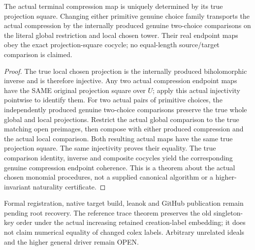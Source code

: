 \begin{theorem}
\label{hir:nc-ordered-choice-open-unique-choice-cocycle}
\leanok
{}
The actual terminal compression map is uniquely determined by its true projection square. Changing either primitive genuine choice family transports the actual compression by the internally produced genuine two-choice comparisons on the literal global restriction and local chosen tower. Their real endpoint maps obey the exact projection-square cocycle; no equal-length source/target comparison is claimed.
\end{theorem}
\begin{proof}
The true local chosen projection is the internally produced biholomorphic inverse and is therefore injective. Any two actual compression endpoint maps have the SAME original projection square over $U$; apply this actual injectivity pointwise to identify them. For two actual pairs of primitive choices, the independently produced genuine two-choice comparisons preserve the true whole global and local projections. Restrict the actual global comparison to the true matching open preimages, then compose with either produced compression and the actual local comparison. Both resulting actual maps have the same true projection square. The same injectivity proves their equality. The true comparison identity, inverse and composite cocycles yield the corresponding genuine compression endpoint coherence. This is a theorem about the actual chosen monomial procedures, not a supplied canonical algorithm or a higher-invariant naturality certificate.
\end{proof}

Formal registration, native target build, leanok and GitHub publication remain pending root recovery. The reference trace theorem preserves the old singleton-key order under the actual increasing retained creation-label embedding; it does not claim numerical equality of changed colex labels. Arbitrary unrelated ideals and the higher general driver remain OPEN.
